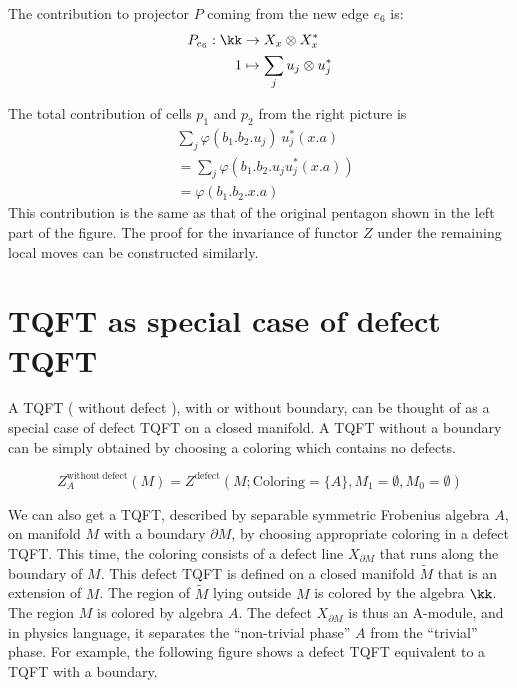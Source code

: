 \begin{defectfiguresetup}
The contribution to projector $P$ coming from the new edge $e_6$ is:
\begin{align*}
	P_{e_6}: \kk &\rightarrow X_x \otimes X_x^*\\
	1 &\mapsto  \sum_j u_j \otimes u_j^*\\
\end{align*}

The total contribution of cells $p_1$ and $p_2$ from the right picture is
\begin{align*}
	& \sum_{j} \varphi(b_1.b_2.u_j)\ u_j^{*}(x.a)\\
	& =\sum_{j} \varphi(b_1.b_2.u_j u_j^{*}(x.a) )\\
	& =\varphi(b_1.b_2.x.a)
\end{align*}
This contribution is the same as that of the original pentagon shown in the left part of the figure. The proof for the invariance of functor $Z$ under the remaining local moves can be constructed similarly.


\section{TQFT as special case of defect TQFT}\label{s:tqft-as-dtqft}
A TQFT ( without defect ), with or without boundary, can be thought of as a special case of defect TQFT on a closed manifold. A TQFT without a boundary can be simply obtained by choosing a coloring which contains no defects.

\begin{equation}
	Z^{\mathrm{without\ defect}}_{A} (M) = Z^{\mathrm{defect}} (M; \mathrm{Coloring}={\{A\} ,M_1= \emptyset,M_0=\emptyset})
\end{equation}

We can also get a TQFT, described by separable symmetric Frobenius algebra $A$, on manifold $M$ with a boundary $\partial M$, by choosing appropriate coloring in a defect TQFT. This time, the coloring consists of a defect line $X_{\partial M}$ that runs along the boundary of $M$. This defect TQFT is defined on a closed manifold $\widetilde{M}$ that is an extension of $M$. The region of $\widetilde{M}$ lying outside $M$ is colored by the algebra $\kk$. The region $M$ is colored by algebra $A$. The defect $X_{\partial M}$ is thus an A-module, and in physics language, it separates the ``non-trivial phase'' $A$ from the ``trivial'' phase. For example, the following figure shows a defect TQFT equivalent to a TQFT with a boundary.



\end{defectfiguresetup}
